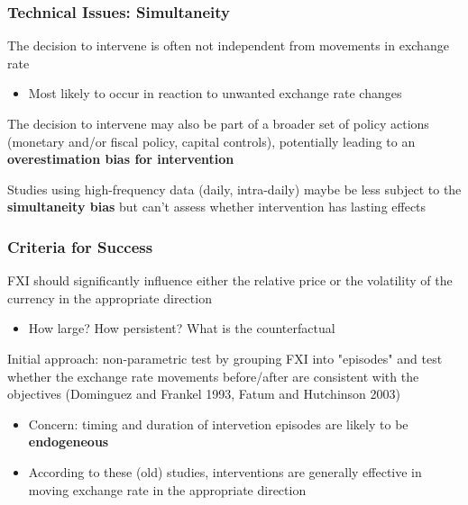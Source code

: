\documentclass{beamer}
\newenvironment{wideitemize}{\itemize\addtolength{\itemsep}{10pt}}{\enditemize}
\begin{document}
\begin{frame}
  \frametitle{Technical Issues: Simultaneity}

  \begin{wideitemize}
  \item The decision to intervene is often not independent from movements in exchange rate
    \begin{itemize}
    \item Most likely to occur in reaction to unwanted exchange rate changes
    \end{itemize}
    \item The decision to intervene may also be part of a broader set of policy actions (monetary and/or fiscal policy, capital controls), potentially leading to an \textbf{overestimation bias for intervention}
    \item Studies using high-frequency data (daily, intra-daily) maybe be less subject to the \textbf{simultaneity bias} but can't assess whether intervention has lasting effects
  \end{wideitemize}  
\end{frame}


\begin{frame}
  \frametitle{Criteria for Success}
  \begin{wideitemize}
    \item FXI should significantly influence either the relative price or the volatility of the currency in the appropriate direction
      \begin{itemize}
      \item How large? How persistent? What is the counterfactual
      \end{itemize}
    \item Initial approach: non-parametric test by grouping FXI into "episodes" and test whether the exchange rate movements before/after are consistent with the objectives (Dominguez and Frankel 1993, Fatum and Hutchinson 2003)
      \begin{itemize}
      \item Concern: timing and duration of intervetion episodes are likely to be \textbf{endogeneous}
      \item According to these (old) studies, interventions are generally effective in moving exchange rate in the appropriate direction
      \end{itemize}
  \end{wideitemize}
\end{frame}
\end{document}
